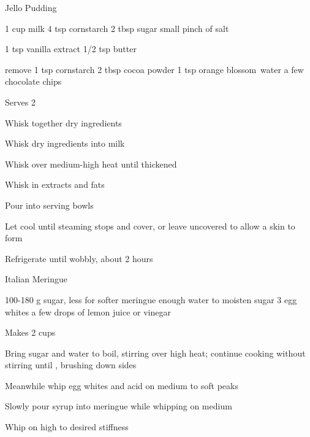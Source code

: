 \begin{denserecipe}{Jello Pudding}{}
\begin{ingredients}
1 cup milk
4 tsp cornstarch
2 tbsp sugar
small pinch of salt

1 tsp vanilla extract
1/2 tsp butter

remove 1 tsp cornstarch
2 tbsp cocoa powder
1 tsp orange \mbox{blossom water}
a few chocolate chips
\end{ingredients}
\nextcolumn
Serves 2
\begin{steps}
    \item Whisk together dry ingredients
    \item Whisk dry ingredients into milk
    \item Whisk over medium-high heat until thickened
    \item Whisk in extracts and fats
    \item Pour into serving bowls
    \item Let cool until steaming stops and cover, or leave uncovered to allow a skin to form
    \item Refrigerate until wobbly, about 2 hours
\end{steps}
\end{denserecipe}

\begin{recipe}{Italian Meringue}{}
\begin{ingredients}
100-180 g sugar, less for softer meringue
enough water to moisten sugar
3 egg whites
a few drops of lemon juice or vinegar
\end{ingredients}
\nextcolumn
Makes 2 cups
\begin{steps}
    \item Bring sugar and water to boil, stirring over high heat; continue cooking without stirring until , brushing down sides
    \item Meanwhile whip egg whites and acid on medium to soft peaks
    \item Slowly pour syrup into meringue while whipping on medium
    \item Whip on high to desired stiffness
\end{steps}
\end{recipe}

